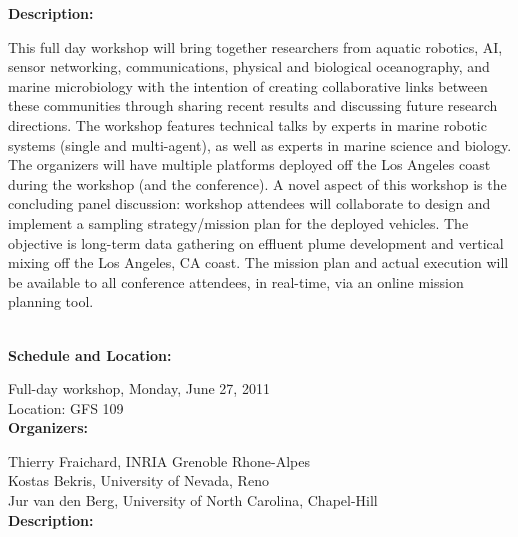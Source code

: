 {{\bf Description: }

This full day workshop will bring together researchers from aquatic robotics, AI, sensor networking, communications, physical and biological oceanography, and marine microbiology with the intention of creating collaborative links between these communities through sharing recent results and discussing future research directions. The workshop features technical talks by experts in marine robotic systems (single and multi-agent), as well as experts in marine science and biology. The organizers will have multiple platforms deployed off the Los Angeles coast during the workshop (and the conference). A novel aspect of this workshop is the concluding panel discussion: workshop attendees will collaborate to design and implement a sampling strategy/mission plan for the deployed vehicles. The objective is long-term data gathering on effluent plume development and vertical mixing off the Los Angeles, CA coast. The mission plan and actual execution will be available to all conference attendees, in real-time, via an online mission planning tool.


\\[5mm]

{\bf  Schedule and Location:}

Full-day workshop, Monday, June 27, 2011\\
Location: GFS 109 \\[4mm]

{\bf  Organizers:}

Thierry Fraichard, INRIA Grenoble Rhone-Alpes\\
Kostas Bekris, University of Nevada, Reno \\
Jur van den Berg, University of North Carolina, Chapel-Hill\\[4mm]

{\bf Description: }

}
